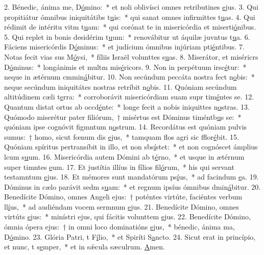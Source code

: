2. Bénedic, ánima me, D\uline{ó}mino:~* et noli oblivísci omnes retributines \uline{e}jus.
3. Qui propitiátur ómnibus iniquitátibs t\uline{u}is:~* qui sanat omnes infirmittes t\uline{u}as.
4. Qui rédimit de intéritu vitm t\uline{u}am:~* qui corónat te in misericórdia et miserti\uline{ó}nibus.
5. Qui replet in bonis desidérim t\uline{u}um:~* renovábitur ut áquilæ juvntus t\uline{u}a.
6. Fáciens misericórdis D\uline{ó}minus:~* et judícium ómnibus injúriam pti\uline{é}ntibus.
7. Notas fecit vias sus M\uline{ó}ysi,~* fíliis Israël volunttes s\uline{u}as.
8. Miserátor, et miséricrs D\uline{ó}minus:~* longánimis et multm mis\uline{é}ricors.
9. Non in perpétuum irsc\uline{é}tur:~* neque in ætérnum cmmin\uline{á}bitur.
10. Non secúndum peccáta nostra fect n\uline{o}bis:~* neque secúndum iniquitátes nostras retríbit n\uline{o}bis.
11. Quóniam secúndum altitúdinem cæli  t\uline{e}rra:~* corroborávit misericórdiam suam supr tim\uline{é}ntes se.
12. Quantum distat ortus ab occd\uline{é}nte:~* longe fecit a nobis iniquittes n\uline{o}stras.
13. Quómodo miserétur pater filiórum,~† misértus est Dóminus timéntb\uline{u}s se:~* quóniam ipse cognóvit figmntum n\uline{o}strum.
14. Recordátus est quóniam pulvis sumus:~† homo, sicut fœnum dis \uline{e}jus,~* tamquam flos agri sic fflor\uline{é}bit.
15. Quóniam spíritus pertransíbit in illo, et non sbs\uline{í}stet:~* et non cognóscet ámplius lcum s\uline{u}um.
16. Misericórdia autem Dómini ab t\uline{é}rno,~* et usque in ætérnum super timntes \uline{e}um.
17. Et justítia illíus in fílios fil\uline{ó}rum,~* his qui servant testamntum \uline{e}jus.
18. Et mémores sunt mandatórum ps\uline{í}us,~* ad facindum \uline{e}a.
19. Dóminus in cælo parávit sedm s\uline{u}am:~* et regnum ipsíus ómnibus dmin\uline{á}bitur.
20. Benedícite Dómino, omnes Angeli ejus:~† poténtes virtúte, faciéntes verbum ll\uline{í}us,~* ad audiéndam vocem sermnum \uline{e}jus.
21. Benedícite Dómino, omnes virtúts \uline{e}jus:~* minístri ejus, qui fácitis volunttem \uline{e}jus.
22. Benedícite Dómino, ómnia ópera ejus:~† in omni loco dominatións \uline{e}jus,~* bénedic, ánima ma, D\uline{ó}mino.
23. Glória Patri, t F\uline{í}lio,~* et Spiríti S\uline{a}ncto.
24. Sicut erat in princípio, et nunc, t s\uline{e}mper,~* et in sǽcula sæculrum. \uline{A}men.
